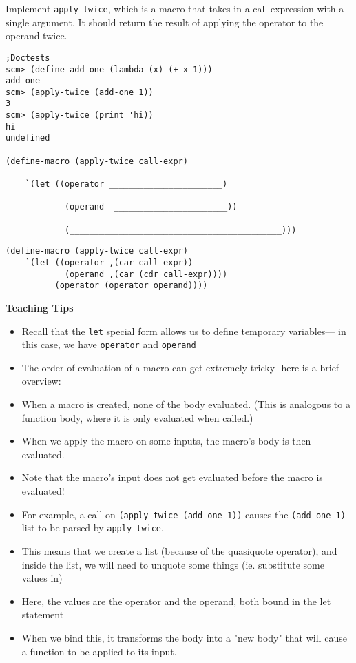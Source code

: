 \begin{blocksection}

\question Implement \texttt{apply-twice}, which is a macro that takes in a call expression with
a single argument. It should return the result of applying the operator to the operand twice.

\begin{lstlisting}
;Doctests
scm> (define add-one (lambda (x) (+ x 1)))
add-one
scm> (apply-twice (add-one 1))
3
scm> (apply-twice (print 'hi))
hi
undefined

(define-macro (apply-twice call-expr)

    `(let ((operator _______________________)

            (operand  _______________________))

            (___________________________________________)))
\end{lstlisting}

\begin{solution}[0.5in]
\begin{lstlisting}
(define-macro (apply-twice call-expr)
    `(let ((operator ,(car call-expr))
            (operand ,(car (cdr call-expr))))
          (operator (operator operand))))
\end{lstlisting}
\end{solution}
\end{blocksection}

\begin{guide}
\begin{blocksection}
\textbf{Teaching Tips}
\begin{itemize}
  \item Recall that the \lstinline{let} special form allows us to define temporary variables— in this case,
    we have \lstinline{operator} and \lstinline{operand}
  \item The order of evaluation of a macro can get extremely tricky- here is a brief overview:
  \item When a macro is created, none of the body evaluated. (This is analogous to a
  function body, where it is only evaluated when called.)
  \item When we apply the macro on some inputs, the macro’s body is then evaluated.
  \item Note that the macro’s input does not get evaluated before the macro is evaluated!
  \item For example, a call on \lstinline{(apply-twice (add-one 1))} causes the \lstinline{(add-one 1)} list to be
  parsed by \lstinline{apply-twice}.
  \item This means that we create a list (because of the quasiquote
  operator), and inside the list, we will need to unquote some things (ie. substitute some
  values in)
  \item Here, the values are the operator and the operand, both bound in the let
  statement
  \item When we bind this, it transforms the body into a "new body" that will cause a
  function to be applied to its input.
\end{itemize}

\end{blocksection}
\end{guide}